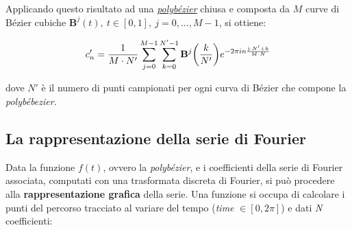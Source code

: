 \documentclass[
]{book}
\begin{document}
Applicando questo risultato ad una \protect\hyperlink{polbezier}{\emph{polybézier}} chiusa e composta da \(M\) curve di Bézier cubiche \(\mathbf{B}^j(t), \ t \in [0,1], \ j=0,...,M-1\), si ottiene:

\begin{equation}
    c'_n=\frac{1}{M\cdot N'}\sum_{j=0}^{M-1}\sum_{k=0}^{N'-1}\mathbf{B}^{j}\bigg(\frac{k}{N'}\bigg)e^{-2\pi in\frac{\text j\cdot N'+ k}{M\cdot N}}
    \label{eq:beziercoeff}
\end{equation}

dove \(N'\) è il numero di punti campionati per ogni curva di Bézier che compone la \emph{polybébezier}.

\hypertarget{rapprserie}{%
\subsection{La rappresentazione della serie di Fourier}\label{rapprserie}}

Data la funzione \(f(t)\), ovvero la \emph{polybézier}, e i coefficienti della serie di Fourier associata, computati con una trasformata discreta di Fourier, si può procedere alla \textbf{rappresentazione grafica} della serie. Una funzione si occupa di calcolare i punti del percorso tracciato al variare del tempo (\emph{time} \(\in [0,2\pi]\)) e dati \emph{N} coefficienti:
\end{document}
